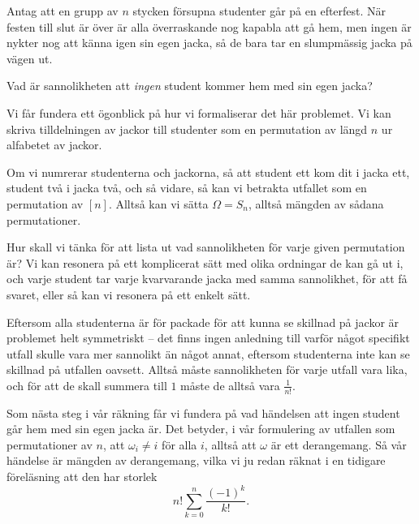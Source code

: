 \documentclass[nobib]{tufte-handout}
\begin{document}
\begin{example}
    Antag att en grupp av $n$ stycken försupna studenter går på en efterfest. När festen till slut är över är alla överraskande nog kapabla att gå hem, men ingen är nykter nog att känna igen sin egen jacka, så de bara tar en slumpmässig jacka på vägen ut.

    Vad är sannolikheten att \emph{ingen} student kommer hem med sin egen jacka?

    Vi får fundera ett ögonblick på hur vi formaliserar det här problemet. Vi kan skriva tilldelningen av jackor till studenter som en permutation av längd $n$ ur alfabetet av jackor. 
    
    Om vi numrerar studenterna och jackorna, så att student ett kom dit i jacka ett, student två i jacka två, och så vidare, så kan vi betrakta utfallet som en permutation av $[n]$. Alltså kan vi sätta $\Omega = S_n$, alltså mängden av sådana permutationer.

    Hur skall vi tänka för att lista ut vad sannolikheten för varje given permutation är? Vi kan resonera på ett komplicerat sätt med olika ordningar de kan gå ut i, och varje student tar varje kvarvarande jacka med samma sannolikhet, för att få svaret, eller så kan vi resonera på ett enkelt sätt.

    Eftersom alla studenterna är för packade för att kunna se skillnad på jackor är problemet helt symmetriskt -- det finns ingen anledning till varför något specifikt utfall skulle vara mer sannolikt än något annat, eftersom studenterna inte kan se skillnad på utfallen oavsett. Alltså måste sannolikheten för varje utfall vara lika, och för att de skall summera till $1$ måste de alltså vara $\frac{1}{n!}$.

    Som nästa steg i vår räkning får vi fundera på vad händelsen att ingen student går hem med sin egen jacka är. Det betyder, i vår formulering av utfallen som permutationer av $n$, att $\omega_i \neq i$ för alla $i$, alltså att $\omega$ är ett derangemang. Så vår händelse är mängden av derangemang, vilka vi ju redan räknat i en tidigare föreläsning att den har storlek
    $$n!\sum_{k=0}^{n} \frac{(-1)^k}{k!}.$$


\end{example}
\end{document}
